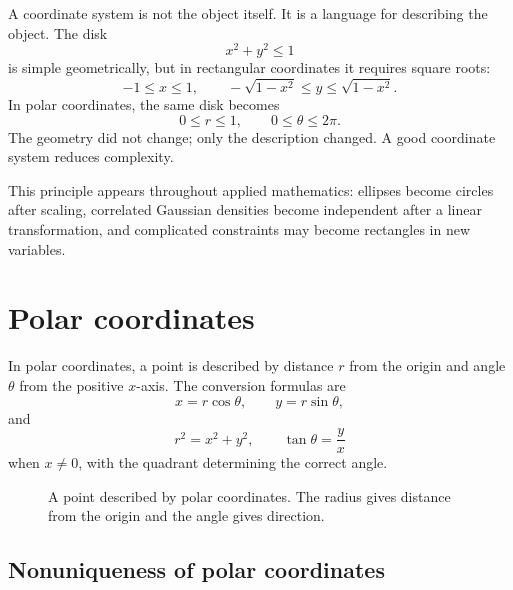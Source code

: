 \documentclass[11pt]{article}
\begin{document}
A coordinate system is not the object itself. It is a language for describing the object. The disk
\[
x^2+y^2\le 1
\]
is simple geometrically, but in rectangular coordinates it requires square roots:
\[
-1\le x\le 1,\qquad -\sqrt{1-x^2}\le y\le \sqrt{1-x^2}.
\]
In polar coordinates, the same disk becomes
\[
0\le r\le 1,\qquad 0\le \theta\le 2\pi.
\]
The geometry did not change; only the description changed. A good coordinate system reduces complexity.

This principle appears throughout applied mathematics: ellipses become circles after scaling, correlated Gaussian densities become independent after a linear transformation, and complicated constraints may become rectangles in new variables.

\section{Polar coordinates}

In polar coordinates, a point is described by distance $r$ from the origin and angle $\theta$ from the positive $x$-axis. The conversion formulas are
\[
x=r\cos\theta,\qquad y=r\sin\theta,
\]
and
\[
r^2=x^2+y^2,\qquad \tan\theta=\frac{y}{x}
\]
when $x\ne0$, with the quadrant determining the correct angle.

\begin{figure}[H]
\centering
{}
\caption{A point described by polar coordinates. The radius gives distance from the origin and the angle gives direction.}
\end{figure}

\subsection*{Nonuniqueness of polar coordinates}
\end{document}
